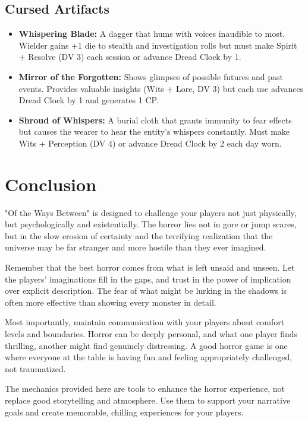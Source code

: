 \documentclass[11pt]{article}
\begin{document}
\subsection{Cursed Artifacts}

\begin{itemize}
\item \textbf{Whispering Blade:} A dagger that hums with voices inaudible to most. Wielder gains +1 die to stealth and investigation rolls but must make Spirit + Resolve (DV 3) each session or advance Dread Clock by 1.
\item \textbf{Mirror of the Forgotten:} Shows glimpses of possible futures and past events. Provides valuable insights (Wits + Lore, DV 3) but each use advances Dread Clock by 1 and generates 1 CP.
\item \textbf{Shroud of Whispers:} A burial cloth that grants immunity to fear effects but causes the wearer to hear the entity's whispers constantly. Must make Wits + Perception (DV 4) or advance Dread Clock by 2 each day worn.
\end{itemize}

\section{Conclusion}

"Of the Ways Between" is designed to challenge your players not just physically, but psychologically and existentially. The horror lies not in gore or jump scares, but in the slow erosion of certainty and the terrifying realization that the universe may be far stranger and more hostile than they ever imagined.

Remember that the best horror comes from what is left unsaid and unseen. Let the players' imaginations fill in the gaps, and trust in the power of implication over explicit description. The fear of what might be lurking in the shadows is often more effective than showing every monster in detail.

Most importantly, maintain communication with your players about comfort levels and boundaries. Horror can be deeply personal, and what one player finds thrilling, another might find genuinely distressing. A good horror game is one where everyone at the table is having fun and feeling appropriately challenged, not traumatized.

The mechanics provided here are tools to enhance the horror experience, not replace good storytelling and atmosphere. Use them to support your narrative goals and create memorable, chilling experiences for your players.
\end{document}

